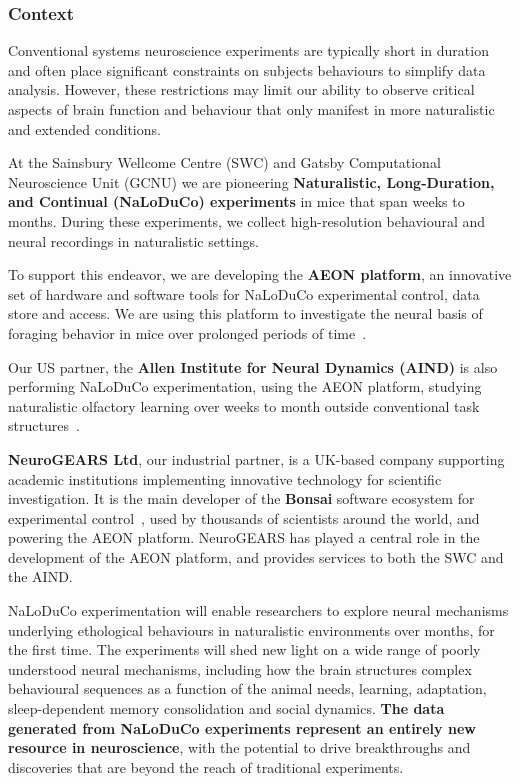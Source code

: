 \subsubsection{Context}

Conventional systems neuroscience experiments are typically short in duration
and often place significant constraints on subjects behaviours to simplify data
analysis.
%
However, these restrictions may limit our ability to observe critical
aspects of brain function and behaviour that only manifest in more naturalistic
and extended conditions.

At the Sainsbury Wellcome Centre (SWC) and Gatsby Computational Neuroscience
Unit (GCNU) we are pioneering \textbf{Naturalistic, Long-Duration, and
Continual (NaLoDuCo) experiments} in mice that span weeks to months. During
these experiments, we collect high-resolution behavioural and neural recordings
in naturalistic settings.

To support this endeavor, we are developing the \textbf{AEON platform}, an
innovative set of hardware and software tools for NaLoDuCo experimental
control, data store and access. We are using this platform to investigate the
neural basis of foraging behavior in mice over prolonged periods of
time~\citep{campagnerEtAl24}.

Our US partner, the \textbf{Allen Institute for Neural Dynamics (AIND)} is also
performing NaLoDuCo experimentation, using the AEON platform, studying
naturalistic olfactory learning over weeks to month outside conventional task
structures~\citep{finkEtAl24}.

\textbf{NeuroGEARS Ltd}, our industrial partner, is a UK-based company
supporting academic institutions implementing innovative technology for
scientific investigation.
%
It is the main developer of the \textbf{Bonsai} software ecosystem for
experimental control~\citep{lopesEtAl15}, used by thousands of scientists
around the world, and powering the AEON platform.
%
NeuroGEARS  has played a central role in the development of the AEON platform,
and provides services to both the SWC and the AIND.

NaLoDuCo experimentation will enable researchers to explore neural mechanisms
underlying ethological behaviours in naturalistic environments over months, for
the first time.  The experiments will shed new light on a wide range of poorly
understood neural mechanisms, including how the brain structures complex
behavioural sequences as a function of the animal needs, learning, adaptation,
sleep-dependent memory consolidation and social dynamics.
%
\textbf{The data generated from NaLoDuCo experiments represent an entirely new
resource in neuroscience}, with the potential to drive breakthroughs and
discoveries that are beyond the reach of traditional experiments.

